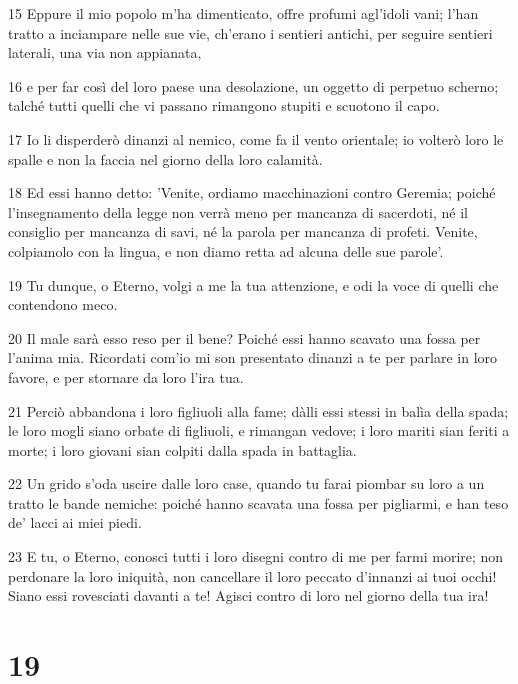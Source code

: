 \par 15 Eppure il mio popolo m'ha dimenticato, offre profumi agl'idoli vani; l'han tratto a inciampare nelle sue vie, ch'erano i sentieri antichi, per seguire sentieri laterali, una via non appianata,
\par 16 e per far così del loro paese una desolazione, un oggetto di perpetuo scherno; talché tutti quelli che vi passano rimangono stupiti e scuotono il capo.
\par 17 Io li disperderò dinanzi al nemico, come fa il vento orientale; io volterò loro le spalle e non la faccia nel giorno della loro calamità.
\par 18 Ed essi hanno detto: 'Venite, ordiamo macchinazioni contro Geremia; poiché l'insegnamento della legge non verrà meno per mancanza di sacerdoti, né il consiglio per mancanza di savi, né la parola per mancanza di profeti. Venite, colpiamolo con la lingua, e non diamo retta ad alcuna delle sue parole'.
\par 19 Tu dunque, o Eterno, volgi a me la tua attenzione, e odi la voce di quelli che contendono meco.
\par 20 Il male sarà esso reso per il bene? Poiché essi hanno scavato una fossa per l'anima mia. Ricordati com'io mi son presentato dinanzi a te per parlare in loro favore, e per stornare da loro l'ira tua.
\par 21 Perciò abbandona i loro figliuoli alla fame; dàlli essi stessi in balìa della spada; le loro mogli siano orbate di figliuoli, e rimangan vedove; i loro mariti sian feriti a morte; i loro giovani sian colpiti dalla spada in battaglia.
\par 22 Un grido s'oda uscire dalle loro case, quando tu farai piombar su loro a un tratto le bande nemiche: poiché hanno scavata una fossa per pigliarmi, e han teso de' lacci ai miei piedi.
\par 23 E tu, o Eterno, conosci tutti i loro disegni contro di me per farmi morire; non perdonare la loro iniquità, non cancellare il loro peccato d'innanzi ai tuoi occhi! Siano essi rovesciati davanti a te! Agisci contro di loro nel giorno della tua ira!

\chapter{19}

